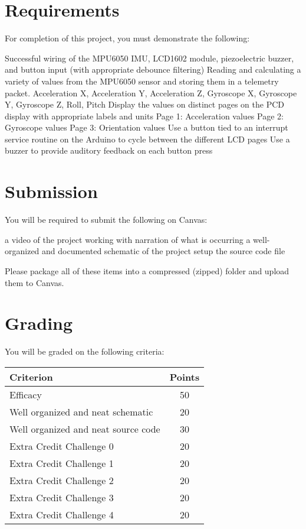 \section*{Requirements} 
For completion of this project, you must demonstrate the following:
\begin{outline}
    \1 Successful wiring of the MPU6050 IMU, LCD1602 module, piezoelectric buzzer, and button input (with appropriate debounce filtering)
    \1 Reading and calculating a variety of values from the MPU6050 sensor and storing them in a telemetry packet.
        \2 Acceleration X,
        \2 Acceleration Y,
        \2 Acceleration Z,
        \2 Gyroscope X,
        \2 Gyroscope Y,
        \2 Gyroscope Z,
        \2 Roll,
        \2 Pitch
    \1 Display the values on distinct pages on the PCD display with appropriate labels and units
        \2 Page 1: Acceleration values
        \2 Page 2: Gyroscope values
        \2 Page 3: Orientation values
    \1 Use a button tied to an interrupt service routine on the Arduino to cycle between the different LCD pages
    \2 Use a buzzer to provide auditory feedback on each button press 
\end{outline}

\section*{Submission}
You will be required to submit the following on Canvas:
\begin{outline}
    \1 a video of the project working with narration of what is occurring
    \1 a well-organized and documented schematic of the project setup
    \1 the source code file
\end{outline}
Please package all of these items into a compressed (zipped) folder and upload them to Canvas.

\section*{Grading} 
You will be graded on the following criteria:
\begin{table}[h!]
    \begin{tabular}{l | c}
        \toprule
        Criterion & Points \\

        \midrule
        Efficacy & 50 \\
        Well organized and neat schematic & 20 \\
        Well organized and neat source code & 30 \\
        Extra Credit Challenge 0 \footnotemark & 20 \\
        Extra Credit Challenge 1 & 20 \\
        Extra Credit Challenge 2 & 20 \\
        Extra Credit Challenge 3 & 20 \\
        Extra Credit Challenge 4 & 20 \\

        \bottomrule
    \end{tabular}
\end{table}

